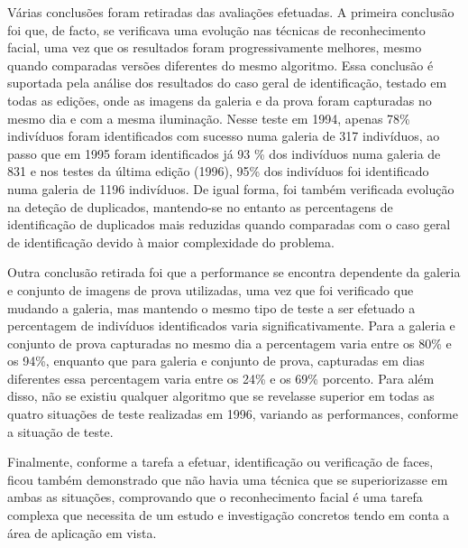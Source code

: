 Várias conclusões foram retiradas das avaliações efetuadas. A primeira conclusão foi que, de facto, se verificava uma evolução nas técnicas de reconhecimento facial, uma vez que os resultados foram progressivamente melhores, mesmo quando comparadas versões diferentes do mesmo algoritmo. Essa conclusão é suportada pela análise dos resultados do caso geral de identificação, testado em todas as edições, onde as imagens da galeria e da prova foram capturadas no mesmo dia e com a mesma iluminação. Nesse teste em 1994, apenas 78\% indivíduos foram identificados com sucesso numa galeria de 317 indivíduos, ao passo que em 1995 foram identificados já 93 \% dos indivíduos numa galeria de 831 e nos testes da última edição (1996), 95\% dos indivíduos foi identificado numa galeria de 1196 indivíduos. De igual forma, foi também verificada evolução na deteção de duplicados, mantendo-se no entanto as percentagens de identificação de duplicados mais reduzidas quando comparadas com o caso geral de identificação devido à maior complexidade do problema.

Outra conclusão retirada foi que a performance se encontra dependente da galeria e conjunto de imagens de prova utilizadas, uma vez que foi verificado que mudando a galeria, mas mantendo o mesmo tipo de teste a ser efetuado a percentagem de indivíduos identificados varia significativamente. Para a galeria e conjunto de prova capturadas no mesmo dia a percentagem varia entre os 80\% e os 94\%, enquanto que para galeria e conjunto de prova, capturadas em dias diferentes essa percentagem varia entre os 24\% e os 69\% porcento. Para além disso, não se existiu qualquer algoritmo que se revelasse superior em todas as quatro situações de teste realizadas em 1996, variando as performances, conforme a situação de teste.

Finalmente, conforme a tarefa a efetuar, identificação ou verificação de faces, ficou também demonstrado que não havia uma técnica que se superiorizasse em ambas as situações, comprovando que o reconhecimento facial é uma tarefa complexa que necessita de um estudo e investigação concretos tendo em conta a área de aplicação em vista.

